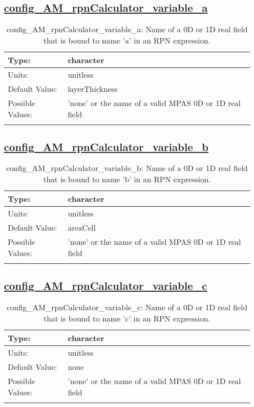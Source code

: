 \subsection[config\_AM\_rpnCalculator\_variable\_a]{\hyperref[sec:nm_tab_AM_rpnCalculator]{config\_AM\_rpnCalculator\_variable\_a}}
\label{subsec:nm_sec_config_AM_rpnCalculator_variable_a}
\begin{center}
\begin{longtable}{| p{2.0in} || p{4.0in} |}
    \hline
    Type: & character \\
    \hline
    Units: & \si{unitless} \\
    \hline
    Default Value: & layerThickness \\
    \hline
    Possible Values: & 'none' or the name of a valid MPAS 0D or 1D real field \\
    \hline
    \caption{config\_AM\_rpnCalculator\_variable\_a: Name of a 0D or 1D real field that is bound to name 'a' in an RPN expression.}
\end{longtable}
\end{center}
\subsection[config\_AM\_rpnCalculator\_variable\_b]{\hyperref[sec:nm_tab_AM_rpnCalculator]{config\_AM\_rpnCalculator\_variable\_b}}
\label{subsec:nm_sec_config_AM_rpnCalculator_variable_b}
\begin{center}
\begin{longtable}{| p{2.0in} || p{4.0in} |}
    \hline
    Type: & character \\
    \hline
    Units: & \si{unitless} \\
    \hline
    Default Value: & areaCell \\
    \hline
    Possible Values: & 'none' or the name of a valid MPAS 0D or 1D real field \\
    \hline
    \caption{config\_AM\_rpnCalculator\_variable\_b: Name of a 0D or 1D real field that is bound to name 'b' in an RPN expression.}
\end{longtable}
\end{center}
\subsection[config\_AM\_rpnCalculator\_variable\_c]{\hyperref[sec:nm_tab_AM_rpnCalculator]{config\_AM\_rpnCalculator\_variable\_c}}
\label{subsec:nm_sec_config_AM_rpnCalculator_variable_c}
\begin{center}
\begin{longtable}{| p{2.0in} || p{4.0in} |}
    \hline
    Type: & character \\
    \hline
    Units: & \si{unitless} \\
    \hline
    Default Value: & none \\
    \hline
    Possible Values: & 'none' or the name of a valid MPAS 0D or 1D real field \\
    \hline
    \caption{config\_AM\_rpnCalculator\_variable\_c: Name of a 0D or 1D real field that is bound to name 'c' in an RPN expression.}
\end{longtable}
\end{center}
